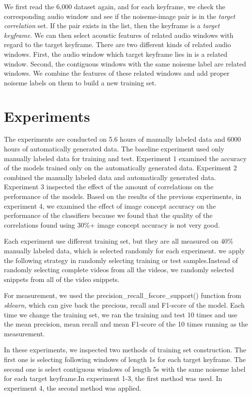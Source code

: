 \documentclass[conference, 11pt, onecolumn]{IEEEtran}
\begin{document}
We first read the 6,000 dataset again, and for each keyframe, we check the corresponding audio window and see if the noiseme-image pair is in the \emph{target correlation} set. If the pair exists in the list, then the keyframe is a \emph{target keyframe}. We can then select acoustic features of related audio windows with regard to the target keyframe. There are two different kinds of related audio windows. First, the audio window which target keyframe lies in is a related window. Second, the contiguous windows with the same noiseme label are related windows. We combine the features of these related windows and add proper noiseme labels on them to build a new training set.


\section{Experiments}
The experiments are conducted on 5.6 hours of manually labeled data and 6000 hours of  automatically generated data. The baseline experiment used only manually labeled data for training and test. Experiment 1 examined the accuracy of the models trained only on the automatically generated data. Experiment 2 combined the manually labeled data and automatically generated data. Experiment 3 inspected the effect of the amount of correlations on the performance of the models. Based on the results of the previous experiments, in  experiment 4, we examined the effect of image concept accuracy on the performance of the classifiers because we found that the quality of the correlations found using 30\%+ image concept accuracy is not very good. 

Each experiment use different training set, but they are all measured on 40\% manually labeled data, which is selected randomly for each experiment. we apply the following strategy in randomly selecting training or test samples.Instead of randomly selecting complete videos from all the videos, we randomly selected snippets from all of the video snippets.

For measurement, we used the  precision\_recall\_fscore\_support() function from \emph{sklearn}, which can give back the precious, recall and F1-score of the model. Each time we change the training set, we ran the training and test 10 times and use the mean precision, mean recall and mean F1-score of the 10 times running as the measurement.

In these experiments, we inspected two methods of training set construction. 
The first one is selecting following windows of length 1s for each target keyframe. The second one is select contiguous windows  of length 5s with the same noiseme label for each target keyframe.In experiment 1-3, the first method was used. In experiment 4,  the second method was applied.
\end{document}
